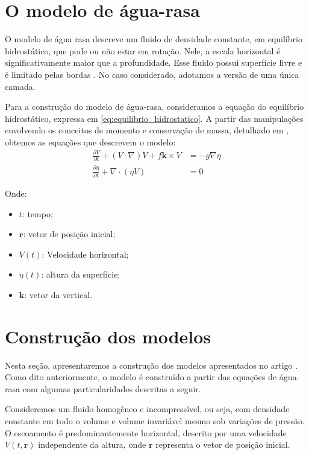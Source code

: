\section{O modelo de água-rasa} \label{sec:ch01_agua_rasa}
O modelo de água rasa descreve um fluido de densidade constante, em equilíbrio hidrostático, que pode ou não estar em rotação. Nele, a escala horizontal é significativamente maior que a profundidade. Esse fluido possui superfície livre e é limitado pelas bordas \citep{Vallis2017}. No caso considerado, adotamos a versão de uma única camada.

Para a construção do modelo de água-rasa, consideramos a equação do equilíbrio hidrostático, expressa em \eqref{eq:equilibrio_hidrostatico}. A partir das manipulações envolvendo os conceitos de momento e conservação de massa, detalhado em \citet{Vallis2017}, obtemos as equações que descrevem o modelo: 
\begin{align}
	\frac{\partial V}{\partial t} + (V \cdot \nabla)V + f \mathbf{k} \times V & = -g \nabla \eta \label{eq:agua-rasa-1} \\
	\frac{\partial \eta}{\partial t} + \nabla \cdot (\eta V)                        & = 0 \label{eq:agua-rasa-2}    
\end{align}

Onde:
\begin{itemize}
    \item $t$: tempo;
    \item $\mathbf{r}$: vetor de posição inicial;
	\item $V(t)$: Velocidade horizontal;
	\item $\eta(t)$: altura da superfície;
	\item $\mathbf{k}$: vetor da vertical.
\end{itemize}

\section{Construção dos modelos} \label{sec:ch01_construcao_do_modelo}
Nesta seção, apresentaremos a construção dos modelos apresentados no artigo \citet{Lorenz1980}. Como dito anteriormente, o modelo é construído a partir das equações de água-rasa com algumas particularidades descritas a seguir. 

Consideremos um fluido homogêneo e incompressível, ou seja, com densidade constante em todo o volume e volume invariável mesmo sob variações de pressão. O escoamento é predominantemente horizontal, descrito por uma velocidade $V(t, \mathbf{r})$ independente da altura, onde $\mathbf{r}$ representa o vetor de posição inicial.


